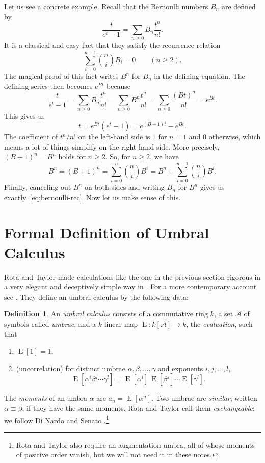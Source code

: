 \documentclass[11pt,a4paper]{report}
\theoremstyle{plain}
\theoremstyle{definition}
\newtheorem{definition}[theorem]{Definition}
\theoremstyle{remark}
\newcommand{\E}{\operatorname{E}}
\begin{document}
Let us see a concrete example. Recall that the Bernoulli numbers
$B_n$ are defined by
\[
  \frac{t}{e^t - 1} = \sum_{n \geq 0} B_n \frac{t^n}{n!} .
\]
It is a classical and easy fact that they satisfy the recurrence relation
\begin{equation}
\label{eq:bernoulli-rec}
  \sum_{i=0}^{n-1} \binom{n}{i} B_i = 0 \qquad (n \geq 2) .
\end{equation}
The magical proof of this fact writes $B^n$ for $B_n$ in the defining equation. The defining
series then becomes $e^{Bt}$ because 
\[
\frac{t}{e^t - 1} =
\sum_{n \geq 0} B_n \frac{t^n}{n!} = 
\sum_{n \geq 0} B^n \frac{t^n}{n!} =
\sum_{n \geq 0} \frac{(Bt)^n}{n!} =
e^{Bt}.
\]
This gives us
\[
  t = e^{Bt}(e^t - 1) = e^{(B+1)t} - e^{Bt} .
\]
The coefficient of $t^n/n!$ on the left-hand side is $1$ for $n = 1$ and $0$ otherwise, 
which means a lot of things simplify on the right-hand side. More precisely, $(B+1)^n = B^n$ 
holds for $n \geq 2$. So, for $n \geq 2$, we have
\[
B^n = (B + 1)^n = \sum_{i=0}^n \binom{n}{i} B^i = B^n + \sum_{i=0}^{n - 1} \binom{n}{i} B^i .
\]
Finally, canceling out $B^n$ on both sides and writing $B_n$ for $B^n$ gives us 
exactly~\eqref{eq:bernoulli-rec}. Now let us make sense of this.


\section{Formal Definition of Umbral Calculus}
\label{sec:umbrae}

Rota and Taylor made calculations like the one in the previous section rigorous in a very elegant and 
deceptively simple way in \cite{RotaTaylor1994}. For a more contemporary account see \cite{Gessel2003}.
They define an umbral calculus by the following data:

\begin{definition}
\label{def:umbral}
An \emph{umbral calculus} consists of a commutative ring $k$, a set $\mathcal{A}$
of symbols called \emph{umbrae}, and a $k$-linear map
$\E : k[\mathcal{A}] \to k$, the \emph{evaluation}, such that
\begin{enumerate}
\item[(U1)] $\E[1] = 1$;
\item[(U2)] (uncorrelation) for distinct umbrae $\alpha, \beta, \dots, \gamma$ and
  exponents $i, j, \dots, l$,
  \[
    \E[\alpha^{i}\beta^{j}\cdots\gamma^{l}]
      = \E[\alpha^{i}]\,\E[\beta^{j}]\cdots\E[\gamma^{l}] .
  \]
\end{enumerate}
The \emph{moments} of an umbra $\alpha$ are $a_n = \E[\alpha^n]$.
Two umbrae are \emph{similar}, written $\alpha \equiv \beta$, if they have the
same moments. Rota and Taylor call them \emph{exchangeable}; we follow
Di Nardo and Senato \cite{DiNardoSenato2001}.\footnote{Rota and Taylor also require an augmentation umbra, all of whose moments of
positive order vanish, but we will not need it in these notes.}
\end{definition}
\end{document}
